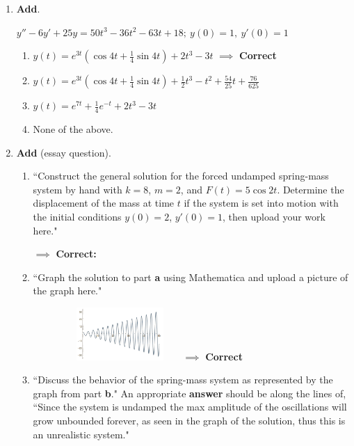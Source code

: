 \documentclass[fleqn]{article}[11pt]
\begin{document}
\begin{enumerate}
	\item \textbf{Add}.
			
		\(y''-6y'+25y=50t^3-36t^2-63t+18;\ y(0)=1,\ y'(0)= 1\)
			\begin{enumerate}
				\item $y(t)=e^{3t}(\cos{4t} + \frac{1}{4}\sin{4t})+2t^{3}-3t$ $\implies$ \textbf{Correct}
				\item $y(t)=e^{3t}(\cos{4t} + \frac{1}{4}\sin{4t})+\frac{1}{2}t^{3}-t^{2}+\frac{54}{25}t+\frac{76}{625}$
				\item $y(t)=e^{7t} + \frac{1}{4}e^{-t}+2t^{3}-3t$
				\item None of the above.
			\end{enumerate}

		
	
	\item \textbf{Add} (essay question). 
	
		\begin{enumerate}
						\item ``Construct the general solution for the forced undamped spring-mass system by hand with $k=8$, $m=2$, and $F(t)=5\cos{2t}$. Determine the displacement of the mass at time $t$ if the system is set into motion with the initial conditions $y(0)=2$, $y'(0)=1$, then upload your work here." 

$\implies$ \textbf{Correct:} 
						\item ``Graph the solution to part \textbf{\textup{a}} using Mathematica and upload a picture of the graph here." 	\begin{figure}[h]
			\centering
				\graphicspath{{/Users/tylertrogden/Desktop/}}
				\includegraphics[height=2cm,width=4.5cm]{W10_WQ_Q9} $\implies$ \textbf{Correct}
		\end{figure} 

						\item ``Discuss the behavior of the spring-mass system as represented by the graph from part \textbf{\textup{b}}." An appropriate \textbf{answer} should be along the lines of, ``Since the system is undamped the max amplitude of the oscillations will grow unbounded forever, as seen in the graph of the solution, thus this is an unrealistic system."
						

\end{enumerate}
\end{enumerate}
\end{document}
